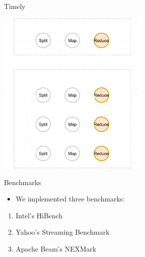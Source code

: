 \documentclass[14pt,t]{beamer}
\renewcommand{\title}[1]{
  {\huge #1} \vskip 0.4cm
}
\begin{document}
\begin{frame}
  \title{Timely}
  \begin{center}
    \includegraphics[height=8cm]{dataflow.png}
  \end{center}
\end{frame}

\begin{frame}
  \title{Benchmarks}
  \begin{itemize}
  \item We implemented three benchmarks:
  \end{itemize}
  \begin{enumerate}
  \item Intel's HiBench
  \item Yahoo's Streaming Benchmark
  \item Apache Beam's NEXMark
  \end{enumerate}
\end{frame}
\end{document}
